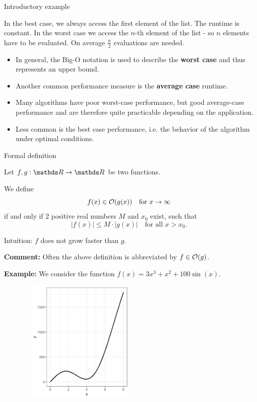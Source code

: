 \documentclass[11pt,compress,t,notes=noshow, xcolor=table]{beamer}
\begin{document}
\begin{vbframe}{Introductory example}
\begin{footnotesize}
In the best case, we always access the first element of the list. The runtime is constant. In the worst case we access the $n$-th element of the list - so $n$ elements have to be evaluated. On average $\frac{n}{2}$ evaluations are needed.
\end{footnotesize}


\framebreak

\begin{itemize}
  \item In general, the Big-O notation is used to describe the \textbf{worst case} and
  thus represents an upper bound.
  \item Another common performance measure is the \textbf{average case} runtime.
  \item Many algorithms have poor worst-case performance, but good average-case performance and are therefore quite practicable depending on the application.
  \item Less common is the best case performance, i.e. the behavior of the algorithm under optimal conditions.
\end{itemize}


\end{vbframe}

\begin{vbframe}{Formal definition}

Let $f, g: \R \to \R$ be two functions.

\lz

We define
$$
f(x) \in \mathcal{O}(g(x)) \quad \text{for } x \to \infty
$$
if and only if 2 positive real numbers $M$ and $x_0$ exist, such that
$$
|f(x)| \leq M \cdot |g(x)| \quad \text{for all } x > x_0.
$$

\lz

Intuition: $f$ does not grow faster than $g$.

\lz

\textbf{Comment:} Often the above definition is abbreviated by $f \in \mathcal{O}(g)$.

\framebreak

\textbf{Example:} We consider the function $f(x) = 3 x^3 + x^2 + 100 \sin(x)$.

\lz
\begin{center}
\begin{figure}
  \includegraphics[height = 6cm, width = 6cm]{figure_man/Example1.png}
\end{figure}
\end{center}

\end{vbframe}
\end{document}
